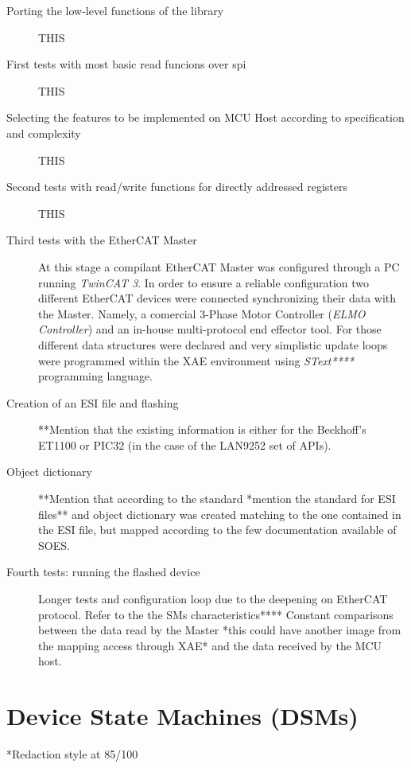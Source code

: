 \begin{description}
\item[Porting the low-level functions of the library] THIS
\item[First tests with most basic read funcions over spi] THIS
\item[Selecting the features to be implemented on MCU Host according to specification and complexity] THIS
\item[Second tests with read/write functions for directly addressed registers] THIS
\item[Third tests with the EtherCAT Master] At this stage a compilant EtherCAT Master was configured through a PC running \emph{TwinCAT 3}. In order to ensure a reliable configuration two different EtherCAT devices were connected synchronizing their data with the Master. Namely, a comercial 3-Phase Motor Controller (\emph{ELMO Controller}) and an in-house multi-protocol end effector tool. For those different data structures were declared and very simplistic update loops were programmed within the XAE environment using \emph{SText****} programming language.
\item[Creation of an ESI file and flashing] **Mention that the existing information is either for the Beckhoff's ET1100 or PIC32 (in the case of the LAN9252 set of APIs).
\item[Object dictionary] **Mention that according to the standard *mention the standard for ESI files** and object dictionary was created matching to the one contained in the ESI file, but mapped according to the few documentation available of SOES.
\item[Fourth tests: running the flashed device] Longer tests and configuration loop due to the deepening on EtherCAT protocol. Refer to the the SMs characteristics**** Constant comparisons between the data read by the Master *this could have another image from the mapping access through XAE* and the data received by the MCU host.
\end{description}


\section{Device State Machines (DSMs)}\label{sec:statemachines}
*Redaction style at 85/100


